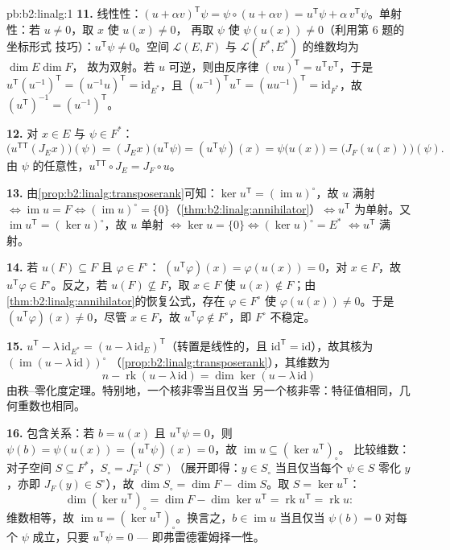 \begin{solution}{pb:b2:linalg:1}
\textbf{11.} 线性性：$(u + \alpha v)^{\mathsf T}\psi = \psi
\circ (u + \alpha v) = u^{\mathsf T}\psi + \alpha\, v^{\mathsf
T}\psi$。单射性：若 $u \neq 0$，取 $x$ 使 $u(x) \neq 0$，
再取 $\psi$ 使 $\psi(u(x)) \neq 0$（利用第 6 题的坐标形式
技巧）：$u^{\mathsf T}\psi \neq 0$。空间 $\mathcal{L}(E,F)$
与 $\mathcal{L}(F^*, E^*)$ 的维数均为 $\dim E \dim F$，
故为双射。若 $u$ 可逆，则由反序律 $(vu)^{\mathsf
T} = u^{\mathsf T}v^{\mathsf T}$，于是 $u^{\mathsf
T}(u^{-1})^{\mathsf T} = (u^{-1}u)^{\mathsf T} =
\mathrm{id}_{E^*}$，且 $(u^{-1})^{\mathsf T}u^{\mathsf T} =
(uu^{-1})^{\mathsf T} = \mathrm{id}_{F^*}$，故 $(u^{\mathsf
T})^{-1} = (u^{-1})^{\mathsf T}$。

\textbf{12.} 对 $x \in E$ 与 $\psi \in F^*$：
\[
\bigl(u^{\mathsf T\mathsf T}(J_E x)\bigr)(\psi)
= (J_E x)\bigl(u^{\mathsf T}\psi\bigr)
= (u^{\mathsf T}\psi)(x)
= \psi\bigl(u(x)\bigr)
= \bigl(J_F(u(x))\bigr)(\psi).
\]
由 $\psi$ 的任意性，$u^{\mathsf T\mathsf T} \circ J_E = J_F
\circ u$。

\textbf{13.} 由\cref{prop:b2:linalg:transposerank}可知：$\ker
u^{\mathsf T} = (\operatorname{im} u)^\circ$，故 $u$ 满射
$\iff \operatorname{im} u = F \iff (\operatorname{im}u)^\circ =
\{0\}$（\cref{thm:b2:linalg:annihilator}）$\iff u^{\mathsf T}$
为单射。又 $\operatorname{im} u^{\mathsf T} = (\ker
u)^\circ$，故 $u$ 单射 $\iff \ker u = \{0\} \iff (\ker
u)^\circ = E^*$ $\iff u^{\mathsf T}$ 满射。

\textbf{14.} 若 $u(F) \subseteq F$ 且 $\varphi \in F^\circ$：
$(u^{\mathsf T}\varphi)(x) = \varphi(u(x)) = 0$，对 $x \in F$，故
$u^{\mathsf T}\varphi \in F^\circ$。反之，若 $u(F)
\not\subseteq F$，取 $x \in F$ 使 $u(x) \notin F$；由
\cref{thm:b2:linalg:annihilator}的恢复公式，存在
$\varphi \in F^\circ$ 使 $\varphi(u(x)) \neq 0$。于是
$(u^{\mathsf T}\varphi)(x) \neq 0$，尽管 $x \in F$，故
$u^{\mathsf T}\varphi \notin F^\circ$，即 $F^\circ$ 不稳定。

\textbf{15.} $u^{\mathsf T} - \lambda\,\mathrm{id}_{E^*} = (u -
\lambda\,\mathrm{id}_E)^{\mathsf T}$（转置是线性的，且
$\mathrm{id}^{\mathsf T} = \mathrm{id}$），故其核为
$(\operatorname{im}(u - \lambda\,\mathrm{id}))^\circ$
（\cref{prop:b2:linalg:transposerank}），其维数为
\[
n - \operatorname{rk}(u - \lambda\,\mathrm{id})
= \dim\ker(u - \lambda\,\mathrm{id})
\]
由秩--零化度定理。特别地，一个核非零当且仅当
另一个核非零：特征值相同，几何重数也相同。

\textbf{16.} 包含关系：若 $b = u(x)$ 且 $u^{\mathsf T}\psi =
0$，则 $\psi(b) = \psi(u(x)) = (u^{\mathsf T}\psi)(x) = 0$，故
$\operatorname{im} u \subseteq (\ker u^{\mathsf T})_\circ$。
比较维数：对子空间 $S \subseteq F^*$，$S_\circ =
J_F^{-1}(S^\circ)$（展开即得：$y \in S_\circ$ 当且仅当每个 $\psi \in
S$ 零化 $y$，亦即 $J_F(y) \in S^\circ$），故 $\dim S_\circ = \dim
F - \dim S$。取 $S = \ker u^{\mathsf T}$：
\[
\dim(\ker u^{\mathsf T})_\circ
= \dim F - \dim\ker u^{\mathsf T}
= \operatorname{rk} u^{\mathsf T} = \operatorname{rk} u :
\]
维数相等，故 $\operatorname{im} u = (\ker
u^{\mathsf T})_\circ$。换言之，$b \in \operatorname{im} u$ 当且仅当
$\psi(b) = 0$ 对每个 $\psi$ 成立，只要 $u^{\mathsf T}\psi = 0$ ---
即弗雷德霍姆择一性。


\end{solution}
